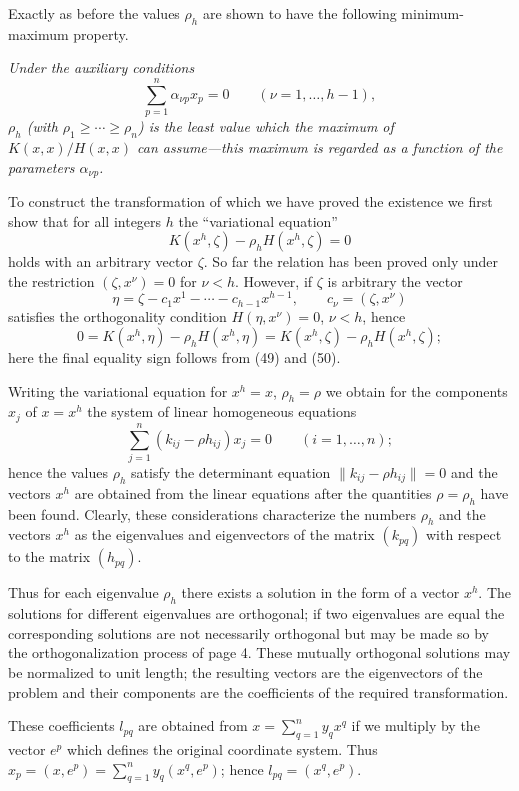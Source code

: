 Exactly as before the values $\rho_h$ are shown to have the following minimum-maximum property.

\emph{Under the auxiliary conditions}
\[\sum_{p=1}^{n}\alpha_{\nu p}x_p=0\qquad(\nu=1,\ldots,h-1),\]
\emph{$\rho_h$ (with $\rho_1\ge\cdots\ge\rho_n$) is the least value which the maximum of $K(x,x)/H(x,x)$ can assume---this maximum is regarded as a function of the parameters $\alpha_{\nu p}$.}

To construct the transformation of which we have proved the existence we first show that for all integers $h$ the ``variational equation''
\[K(x^h,\zeta)-\rho_hH(x^h,\zeta)=0\]
holds with an arbitrary vector $\zeta$. So far the relation has been proved only under the restriction $(\zeta,x^\nu)=0$ for $\nu<h$. However, if $\zeta$ is arbitrary the vector
\[\eta=\zeta-c_1x^1-\cdots-c_{h-1}x^{h-1},\qquad c_\nu=(\zeta,x^\nu)\]
satisfies the orthogonality condition $H(\eta,x^\nu)=0$, $\nu<h$, hence
\[0=K(x^h,\eta)-\rho_hH(x^h,\eta)=K(x^h,\zeta)-\rho_hH(x^h,\zeta);\]
here the final equality sign follows from (49) and (50).

Writing the variational equation for $x^h=x$, $\rho_h=\rho$ we obtain for the components $x_j$ of $x=x^h$ the system of linear homogeneous equations
\[\sum_{j=1}^{n}(k_{ij}-\rho h_{ij})x_j=0\qquad(i=1,\ldots,n);\]
hence the values $\rho_h$ satisfy the determinant equation $\|k_{ij}-\rho h_{ij}\|=0$ and the vectors $x^h$ are obtained from the linear equations after the quantities $\rho=\rho_h$ have been found. Clearly, these considerations characterize the numbers $\rho_h$ and the vectors $x^h$ as the eigenvalues and eigenvectors of the matrix $(k_{pq})$ with respect to the matrix $(h_{pq})$.

Thus for each eigenvalue $\rho_h$ there exists a solution in the form of a vector $x^h$. The solutions for different eigenvalues are orthogonal; if two eigenvalues are equal the corresponding solutions are not necessarily orthogonal but may be made so by the orthogonalization process of page 4. These mutually orthogonal solutions may be normalized to unit length; the resulting vectors are the eigenvectors of the problem and their components are the coefficients of the required transformation.

These coefficients $l_{pq}$ are obtained from $x=\sum_{q=1}^{n}y_qx^q$ if we multiply by the vector $e^p$ which defines the original coordinate system. Thus $x_p=(x,e^p)=\sum_{q=1}^{n}y_q(x^q,e^p)$; hence $l_{pq}=(x^q,e^p)$.

